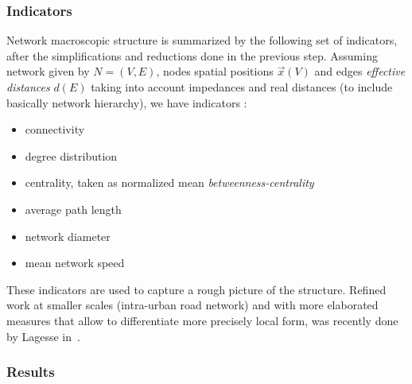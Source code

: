 \subsubsection{Indicators}

Network macroscopic structure is summarized by the following set of indicators, after the simplifications and reductions done in the previous step. Assuming network given by $N=(V,E)$, nodes spatial positions $\vec{x}(V)$ and edges \emph{effective distances} $d(E)$ taking into account impedances and real distances (to include basically network hierarchy), we have indicators :
\begin{itemize}
\item connectivity
\item degree distribution
\item centrality, taken as normalized mean \emph{betweenness-centrality}
\item average path length
\item network diameter
\item mean network speed
\end{itemize}

These indicators are used to capture a rough picture of the structure. Refined work at smaller scales (intra-urban road network) and with more elaborated measures that allow to differentiate more precisely local form, was recently done by Lagesse in~\cite{2015arXiv151201268L}.



\subsubsection{Results}












